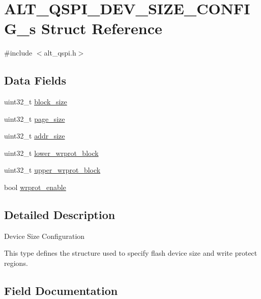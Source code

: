 \hypertarget{structALT__QSPI__DEV__SIZE__CONFIG__s}{}\section{A\+L\+T\+\_\+\+Q\+S\+P\+I\+\_\+\+D\+E\+V\+\_\+\+S\+I\+Z\+E\+\_\+\+C\+O\+N\+F\+I\+G\+\_\+s Struct Reference}
\label{structALT__QSPI__DEV__SIZE__CONFIG__s}


{\ttfamily \#include $<$alt\+\_\+qspi.\+h$>$}

\subsection*{Data Fields}
\begin{DoxyCompactItemize}
\item 
uint32\+\_\+t \mbox{\hyperlink{structALT__QSPI__DEV__SIZE__CONFIG__s_ac380464f9d02e4af3cb70053498615e4}{block\+\_\+size}}
\item 
uint32\+\_\+t \mbox{\hyperlink{structALT__QSPI__DEV__SIZE__CONFIG__s_a8aad79e92570e836f362f94908639f05}{page\+\_\+size}}
\item 
uint32\+\_\+t \mbox{\hyperlink{structALT__QSPI__DEV__SIZE__CONFIG__s_a7b7a746674f296e4678e2f61e7d6c587}{addr\+\_\+size}}
\item 
uint32\+\_\+t \mbox{\hyperlink{structALT__QSPI__DEV__SIZE__CONFIG__s_a8b5117840e5e442b94ffe611d189ab92}{lower\+\_\+wrprot\+\_\+block}}
\item 
uint32\+\_\+t \mbox{\hyperlink{structALT__QSPI__DEV__SIZE__CONFIG__s_a2c554e5af4f4e2c365c08797fc3e8c67}{upper\+\_\+wrprot\+\_\+block}}
\item 
bool \mbox{\hyperlink{structALT__QSPI__DEV__SIZE__CONFIG__s_a58b821b3c936320647b0ab87fb356d9a}{wrprot\+\_\+enable}}
\end{DoxyCompactItemize}


\subsection{Detailed Description}
Device Size Configuration

This type defines the structure used to specify flash device size and write protect regions. 

\subsection{Field Documentation}
\mbox{\label{structALT__QSPI__DEV__SIZE__CONFIG__s_a7b7a746674f296e4678e2f61e7d6c587}} 
